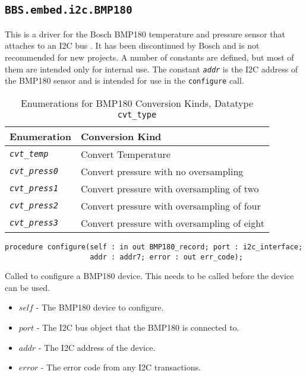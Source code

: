 \documentclass[10pt, openany]{book}
\newcommand{\indextype}[1]{\index[type]{#1}}
\newcommand{\indexfunc}[1]{\index[func]{#1}}
\newcommand{\package}[1]{\texttt{#1}}
\newcommand{\function}[1]{\texttt{#1}}
\newcommand{\constant}[1]{\emph{\texttt{#1}}}
\newcommand{\datatype}[1]{\texttt{#1}}
\begin{document}
\subsection{\package{BBS.embed.i2c.BMP180}}
This is a driver for the Bosch BMP180 temperature and pressure sensor that attaches to an I2C bus \cite{BMP180}.  It has been discontinued by Bosch and is not recommended for new projects.  A number of constants are defined, but most of them are intended only for internal use.  The constant \constant{addr} is the I2C address of the BMP180 sensor and is intended for use in the \function{configure} call.

\begin{table}[!h]
\begin{center}
  \begin{tabular}{l|l}
    Enumeration & Conversion Kind \\
    \hline
    \constant{cvt\_temp} & Convert Temperature \\
    \constant{cvt\_press0} & Convert pressure with no oversampling \\
    \constant{cvt\_press1} & Convert pressure with oversampling of two \\
    \constant{cvt\_press2} & Convert pressure with oversampling of four  \\
    \constant{cvt\_press3} & Convert pressure with oversampling of eight  \\
  \end{tabular}
  \caption{Enumerations for BMP180 Conversion Kinds, Datatype \datatype{cvt\_type}}
  \label{tbl:BMP180Conv}
  \indextype{cvt\_type}
\end{center}
\end{table}

\begin{lstlisting}
procedure configure(self : in out BMP180_record; port : i2c_interface;
                    addr : addr7; error : out err_code);
\end{lstlisting}
\indexfunc{configure}
Called to configure a BMP180 device.  This needs to be called before the device can be used.
\begin{itemize}
  \item $self$ - The BMP180 device to configure.
  \item $port$ - The I2C bus object that the BMP180 is connected to.
  \item $addr$ - The I2C address of the device.
  \item $error$ - The error code from any I2C transactions.
\end{itemize}
\end{document}
